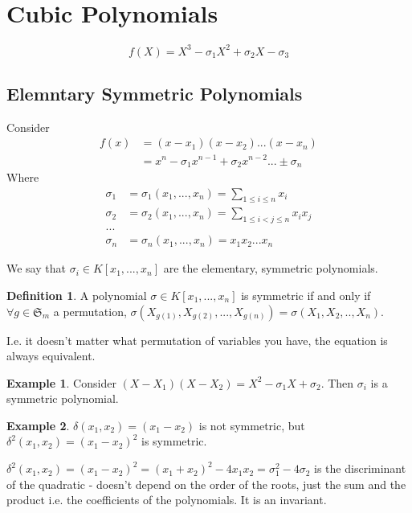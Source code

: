 \documentclass{article}
\theoremstyle{definition}
\newtheorem{defn}{Definition}[section]
\newtheorem{exmp}{Example}[section]
\theoremstyle{plain}%
\theoremstyle{remark}
\begin{document}
\section{Cubic Polynomials}

\[f(X) = X^3 - \sigma_1X^2 + \sigma_2X - \sigma_3\]

\subsection{Elemntary Symmetric Polynomials}

Consider
\begin{align*}
    f(x) &= (x- x_1)(x- x_2) ... (x- x_n) \\
         &= x^n -\sigma_1x^{n-1} + \sigma_2x^{n-2} ... \pm \sigma_n
\end{align*}
Where
\begin{align*}
    \sigma_1 &= \sigma_1(x_1, ..., x_n) = \sum_{1 \le i \le n} x_i \\
    \sigma_2 &= \sigma_2(x_1, ..., x_n) = \sum_{1 \le i < j \le n} x_i x_j \\
    ... \\
    \sigma_n &= \sigma_n(x_1, ..., x_n) = x_1 x_2 ... x_n
\end{align*}

We say that $\sigma_i \in K[x_1, ..., x_n]$ are the elementary, symmetric polynomials.

\begin{defn}
    A polynomial $\sigma \in K[x_1, ..., x_n]$ is symmetric if and only if $\forall g \in \mathfrak{S}_m$ a permutation, $\sigma(X_{g(1)}, X_{g(2)}, ..., X_{g(n)}) = \sigma(X_1, X_2, .., X_n)$. 
    
    I.e. it doesn't matter what permutation of variables you have, the equation is always equivalent.
\end{defn}

\begin{exmp}
    Consider $(X - X_1)(X - X_2) = X^2 - \sigma_1 X + \sigma_2$. Then $\sigma_i$ is a symmetric polynomial.
\end{exmp}

\begin{exmp}
    $\delta(x_1, x_2) = (x_1 - x_2)$ is not symmetric, but $\delta^2(x_1, x_2) = (x_1 - x_2)^2$ is symmetric.
    
    $\delta^2(x_1, x_2) = (x_1 - x_2)^2 = (x_1 + x_2)^2 - 4x_1x_2 = \sigma_1^2 - 4\sigma_2$ is the discriminant of the quadratic - doesn't depend on the order of the roots, just the sum and the product i.e. the coefficients of the polynomials. It is an invariant.
\end{exmp}
\end{document}
